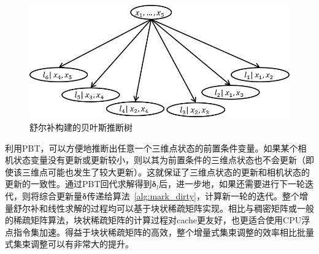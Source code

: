 \begin{figure}[htb!]
    \centering
    \includegraphics[scale=.8]{Pictures/bayes_forest.png}
    \caption{舒尔补构建的贝叶斯推断树}
    \label{fig:bayes_forest}
\end{figure}

利用PBT，可以方便地推断出任意一个三维点状态的前置条件变量。如果某个相机状态变量没有更新或更新较小，则以其为前置条件的三维点状态也不会更新（即使该三维点可能也发生了较大更新）。这就保证了三维点状态的更新和相机状态的更新的一致性。通过PBT回代求解得到$\bm{\delta}_l$后，进一步地，如果还需要进行下一轮迭代，则将综合更新量$\bm{\delta}$传递给算法~\ref{alg:mark_dirty}，计算新一轮的迭代。整个增量舒尔补和线性求解的过程均可以基于块状稀疏矩阵实现。相比与稠密矩阵或一般的稀疏矩阵算法，块状稀疏矩阵的计算过程对cache更友好，也更适合使用CPU浮点指令集加速。得益于块状稀疏矩阵的高效，整个增量式集束调整的效率相比批量式集束调整可以有非常大的提升。
